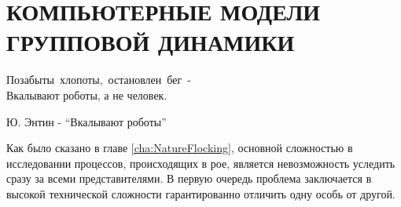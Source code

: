 \chapter{КОМПЬЮТЕРНЫЕ МОДЕЛИ ГРУППОВОЙ ДИНАМИКИ}
\label{ch:ComputerModelsOfHords}

\epigraph{Позабыты~хлопоты,~остановлен~бег~- \\
Вкалывают роботы, а не человек.}{Ю. Энтин - ``Вкалывают роботы''}
Как было сказано в главе \ref{cha:NatureFlocking}, основной сложностью в исследовании процессов, происходящих в рое, является невозможность уследить сразу за всеми представителями. В первую очередь проблема заключается в высокой технической сложности гарантированно отличить одну особь от другой.

